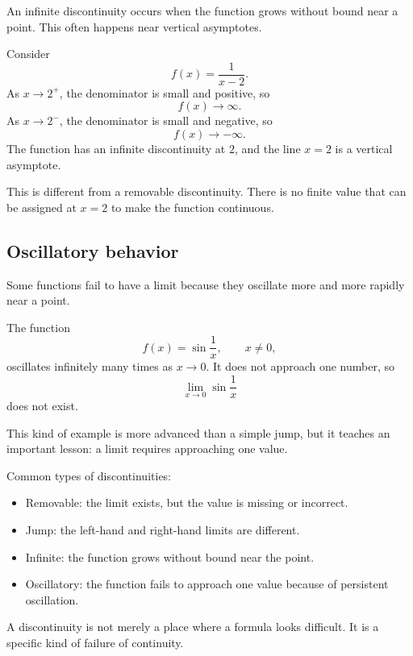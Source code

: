 An infinite discontinuity occurs when the function grows without bound near a point. This often happens near vertical asymptotes.

\begin{examplebox}
Consider
\[
f(x)=\frac1{x-2}.
\]
As \(x\to2^+\), the denominator is small and positive, so
\[
f(x)\to\infty.
\]
As \(x\to2^-\), the denominator is small and negative, so
\[
f(x)\to-\infty.
\]
The function has an infinite discontinuity at \(2\), and the line \(x=2\) is a vertical asymptote.
\end{examplebox}

This is different from a removable discontinuity. There is no finite value that can be assigned at \(x=2\) to make the function continuous.

\subsection*{Oscillatory behavior}

Some functions fail to have a limit because they oscillate more and more rapidly near a point.

\begin{examplebox}
The function
\[
f(x)=\sin\frac1x,
\qquad x\ne0,
\]
oscillates infinitely many times as \(x\to0\). It does not approach one number, so
\[
\lim_{x\to0}\sin\frac1x
\]
does not exist.
\end{examplebox}

This kind of example is more advanced than a simple jump, but it teaches an important lesson: a limit requires approaching one value.

\begin{summarybox}
Common types of discontinuities:
\begin{itemize}
\item Removable: the limit exists, but the value is missing or incorrect.
\item Jump: the left-hand and right-hand limits are different.
\item Infinite: the function grows without bound near the point.
\item Oscillatory: the function fails to approach one value because of persistent oscillation.
\end{itemize}
\end{summarybox}

A discontinuity is not merely a place where a formula looks difficult. It is a specific kind of failure of continuity.
